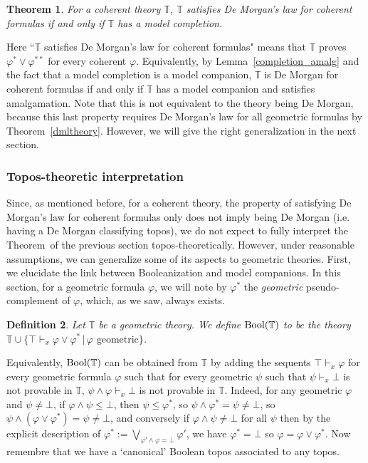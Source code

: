 \documentclass{article}
\newtheorem{theorem}{Theorem}
\newtheorem{definition}[theorem]{Definition}
\newcommand{\T}{\mathbb{T}}
\renewcommand{\phi}{\varphi}
\begin{document}
\begin{theorem}\label{Joyal}
    For a coherent theory $\T$, $\T$ satisfies De Morgan's law for coherent formulas if and only if $\T$ has a model completion.
\end{theorem}

Here ``$\T$ satisfies De Morgan's law for coherent formulas" means that $\T$ proves $\phi^*\lor\phi^{**}$ for every coherent $\phi$. Equivalently, by Lemma~\ref{completion_amalg} and the fact that a model completion is a model companion, $\T$ is De Morgan for coherent formulas if and only if $\T$ has a model companion and satisfies amalgamation. Note that this is not equivalent to the theory being De Morgan, because this last property requires De Morgan's law for all geometric formulas by Theorem~\ref{dmltheory}. However, we will give the right generalization in the next section. 

\subsubsection{Topos-theoretic interpretation}\label{tti}
Since, as mentioned before, for a coherent theory, the property of satisfying De Morgan's law for coherent formulas only does not imply being De Morgan (i.e. having a De Morgan classifying topos), we do not expect to fully interpret the Theorem~of the previous section topos-theoretically. However, under reasonable assumptions, we can generalize some of its aspects to geometric theories. First, we elucidate the link between Booleanization and model companions. In this section, for a geometric formula $\phi$, we will note by $\phi^*$ the \emph{geometric} pseudo-complement of $\phi$, which, as we saw, always exists.

\begin{definition}
    Let $\T$ be a geometric theory. We define $\textup{Bool}(\T)$ to be the theory $\T\cup\{\top\vdash_x\phi\lor\phi^*\,|\,\phi\text{ geometric}\}$.
\end{definition}

Equivalently, $\textup{Bool}(\T)$ can be obtained from $\T$ by adding the sequents $\top\vdash_x\phi$ for every geometric formula $\phi$ such that for every geometric $\psi$ such that $\psi\vdash_x\bot$ is not provable in $\T$, $\psi\land\phi\vdash_x\bot$ is not provable in $\T$. Indeed, for any geometric $\phi$ and $\psi\ne\bot$, if $\phi\land\psi\leq\bot$, then $\psi\leq\phi^*$, so $\psi\land\phi^*=\psi\ne\bot$, so $\psi\land(\phi\lor\phi^*)=\psi\ne\bot$, and conversely if $\phi\land\psi\ne\bot$ for all $\psi$ then by the explicit description of $\phi^*:=\bigvee_{\phi'\land\phi=\bot}\phi'$, we have $\phi^*=\bot$ so $\phi=\phi\lor\phi^*$. Now remembre that we have a `canonical' Boolean topos associated to any topos.
\end{document}
